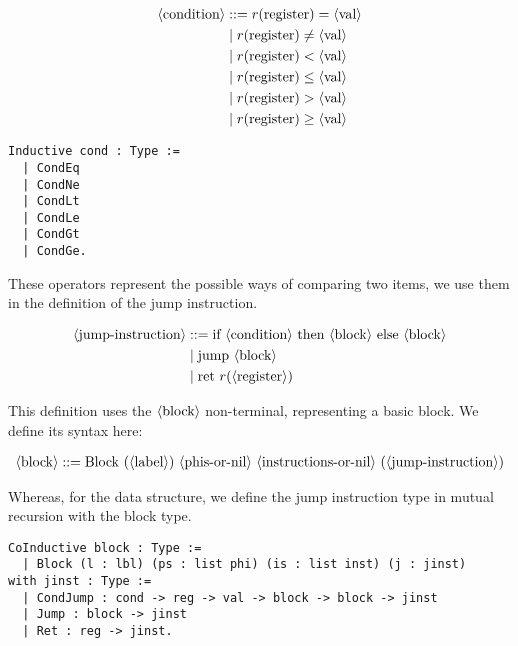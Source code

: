 \begin{minipage}{0.45\linewidth}
\begin{align*}
\langle\text{condition}\rangle &::= r(\text{register}) = \langle\text{val}\rangle \\
&\mid r(\text{register}) \neq \langle\text{val}\rangle \\
&\mid r(\text{register}) < \langle\text{val}\rangle \\
&\mid r(\text{register}) \leq \langle\text{val}\rangle \\
&\mid r(\text{register}) > \langle\text{val}\rangle \\
&\mid r(\text{register}) \geq \langle\text{val}\rangle \\
\end{align*}
\end{minipage}
\hfill
\begin{minipage}{0.45\linewidth}
\begin{lstlisting}[style=Rocq]
Inductive cond : Type :=
  | CondEq
  | CondNe
  | CondLt
  | CondLe
  | CondGt
  | CondGe.
\end{lstlisting}
\end{minipage}

These operators represent the possible ways of comparing two items, we use them in the definition of the jump instruction.

\begin{align*}
\langle\text{jump-instruction}\rangle &::= \text{if} \ \langle\text{condition}\rangle \ \text{then} \ \langle\text{block}\rangle \ \text{else} \ \langle\text{block}\rangle \\
&\mid \text{jump} \ \langle\text{block}\rangle \\
&\mid \text{ret} \ r( \langle\text{register}\rangle )
\end{align*}

This definition uses the $\langle\text{block}\rangle$ non-terminal, representing a basic block. We define its syntax here:

\begin{align*}
\nt{block} ::= \text{Block} \ ( \nt{label} ) \ \nt{phis-or-nil} \ \nt{instructions-or-nil} \ ( \nt{jump-instruction} )
\end{align*}

Whereas, for the data structure, we define the jump instruction type in mutual recursion with the block type.

\begin{lstlisting}[style=Rocq]
CoInductive block : Type :=
  | Block (l : lbl) (ps : list phi) (is : list inst) (j : jinst)
with jinst : Type :=
  | CondJump : cond -> reg -> val -> block -> block -> jinst
  | Jump : block -> jinst
  | Ret : reg -> jinst.
\end{lstlisting}


